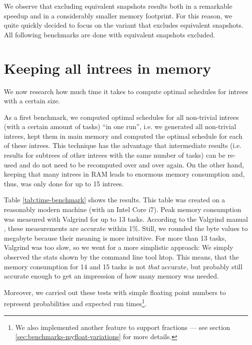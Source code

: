 We observe that excluding equivalent snapshots results both in a remarkable speedup and in a considerably smaller memory footprint. For this reason, we quite quickly decided to focus on the variant that excludes equivalent snapshots. All following benchmarks are done with equivalent snapshots excluded.

\section{Keeping all intrees in memory}
\label{sec:benchmarks-all-intrees-in-memory}

We now research how much time it takes to compute optimal schedules for intrees with a certain size.

As a first benchmark, we computed optimal schedules for all non-trivial intrees (with a certain amount of tasks) ``in one run'', i.e. we generated all non-trivial intrees, kept them in main memory and computed the optimal schedule for each of these intrees. This technique has the advantage that intermediate results (i.e. results for subtrees of other intrees with the same number of tasks) can be re-used and do not need to be recomputed over and over again. On the other hand, keeping that many intrees in RAM leads to enormous memory consumption and, thus, was only done for up to 15 intrees.

Table \ref{tab:time-benchmark} shows the results. This table was created on a reasonably modern machine (with an Intel Core i7). Peak memory consumption was measured with Valgrind for up to 13 tasks. According to the Valgrind manual \cite{massifmanual}, these measurements are accurate within 1\%. Still, we rounded the byte values to megabyte because their meaning is more intuitive. For more than 13 tasks, Valgrind was too slow, so we went for a more simplistic approach: We simply observed the stats shown by the command line tool htop. This means, that the memory consumption for 14 and 15 tasks is not \emph{that} accurate, but probably still accurate enough to get an impression of how many memory was needed.

Moreover, we carried out these tests with simple floating point numbers to represent probabilities and expected run times\footnote{We also implemented another feature to support fractions --- see section \ref{sec:benchmarks-myfloat-variations} for more details.}.


